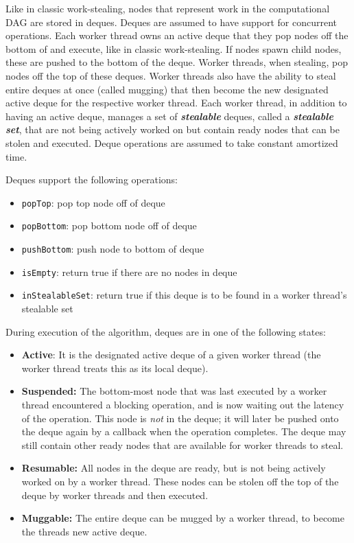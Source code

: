 \documentclass[bsc,frontabs,singlespacing,parskip,deptreport,normalheadings]{infthesis}
\begin{document}
Like in classic work-stealing, nodes that represent work in the computational
DAG are stored in deques. Deques are assumed to have support for concurrent
operations. Each worker thread owns an active deque that they pop nodes off the
bottom of and execute, like in classic work-stealing. If nodes spawn child
nodes, these are pushed to the bottom of the deque. Worker threads, when
stealing, pop nodes off the top of these deques. Worker threads also have the
ability to steal entire deques at once (called mugging) that then become the new
designated active deque for the respective worker thread. Each worker thread, in
addition to having an active deque, manages a set of \textbf{\textit{stealable}}
deques, called a \textbf{\textit{stealable set}}, that are not being actively
worked on but contain ready nodes that can be stolen and executed. Deque
operations are assumed to take constant amortized time.

Deques support the following operations:

\begin{itemize}
    \item \texttt{popTop}: pop top node off of deque
    \item \texttt{popBottom}: pop bottom node off of deque
    \item \texttt{pushBottom}: push node to bottom of deque
    \item \texttt{isEmpty}: return true if there are no nodes in deque
    \item \texttt{inStealableSet}: return true if this deque is to be found in a
        worker thread's stealable set
\end{itemize}

During execution of the algorithm, deques are in one of the following states:

\begin{itemize}
    \item \textbf{Active}: It is the designated active deque of a given worker
        thread (the worker thread treats this as its local deque).
    \item \textbf{Suspended:} The bottom-most node that was last executed by a
        worker thread encountered a blocking operation, and is now waiting out
        the latency of the operation. This node is \textit{not} in the deque; it
        will later be pushed onto the deque again by a callback when the
        operation completes. The deque may still contain other ready nodes that
        are available for worker threads to steal.
    \item \textbf{Resumable:} All nodes in the deque are ready, but is not being
        actively worked on by a worker thread. These nodes can be stolen off the
        top of the deque by worker threads and then executed.
    \item \textbf{Muggable:} The entire deque can be mugged by a worker thread,
        to become the threads new active deque.
\end{itemize}
\end{document}
